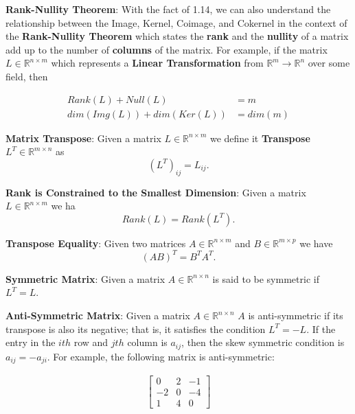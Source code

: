 \documentclass[12pt]{article}
\newenvironment{definition}[2][Definition]{\begin{trivlist}
\item[\hskip \labelsep {\bfseries #1}\hskip \labelsep {\bfseries #2}]}{\end{trivlist}}
\begin{document}
\begin{definition}{2.3} \textbf{Rank-Nullity Theorem}: With the fact of 1.14, we can also understand the relationship between the Image, Kernel, Coimage, and Cokernel in the context of the \textbf{Rank-Nullity Theorem} which states the \textbf{rank} and the \textbf{nullity} of a matrix add up to the number of \textbf{columns} of the matrix. For example, if the matrix \(L \in \mathbb{R}^{n \times m}\) which represents a \textbf{Linear Transformation} from \(\mathbb{R}^m \rightarrow \mathbb{R}^n\) over some field, then

\begin{equation}
\begin{split}
Rank(L) + Null(L) &= m \\
dim(Img(L)) + dim(Ker(L)) &= dim(m)
\end{split}
\end{equation}

\end{definition}

\begin{definition}{2.4} \textbf{Matrix Transpose}: Given a matrix \(L \in \mathbb{R}^{n \times m}\) we define it \textbf{Transpose} \(L^T \in \mathbb{R}^{m \times n}\) as
\[(L^T)_{ij} = L_{ij}.\]
\end{definition}

\begin{definition}{2.5} \textbf{Rank is Constrained to the Smallest Dimension}: Given a matrix \(L \in \mathbb{R}^{n \times m}\) we ha
\[Rank(L) = Rank(L^T).\]
\end{definition}

\begin{definition}{2.6} \textbf{Transpose Equality}: Given two matrices \(A \in \mathbb{R}^{n \times m}\) and \(B \in \mathbb{R}^{m \times p}\) we have
\[(AB)^T = B^T A^T.\]
\end{definition}

\begin{definition}{2.7} \textbf{Symmetric Matrix}: Given a matrix \(A \in \mathbb{R}^{n \times n}\) is said to be symmetric if \(L^T = L\).
\end{definition}

\begin{definition}{2.8} \textbf{Anti-Symmetric Matrix}: Given a matrix \(A \in \mathbb{R}^{n \times n}\) $A$ is anti-symmetric if its transpose is also its negative; that is, it satisfies the condition \(L^T = -L\). If the entry in the $ith$ row and $jth$ column is $a_{ij}$, then the skew symmetric condition is $a_{ij} = −a_{ji}$. For example, the following matrix is anti-symmetric:

\begin{equation}
\begin{split}
    \begin{bmatrix}
        0 & 2 & -1 \\
        -2 & 0 & -4 \\
        1 & 4 & 0
    \end{bmatrix}
\end{split}
\end{equation}

\end{definition}
\end{document}
